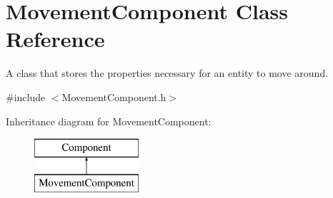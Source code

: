 \hypertarget{class_movement_component}{}\section{Movement\+Component Class Reference}
\label{class_movement_component}


A class that stores the properties necessary for an entity to move around.  




{\ttfamily \#include $<$Movement\+Component.\+h$>$}

Inheritance diagram for Movement\+Component\+:\begin{figure}[H]
\begin{center}
\leavevmode
\includegraphics[height=2.000000cm]{class_movement_component}
\end{center}
\end{figure}
